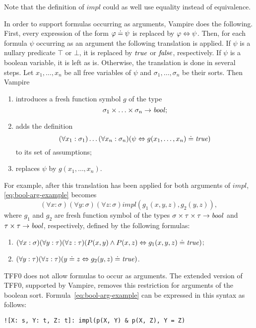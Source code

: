 Note that the definition of $\mathit{impl}$ could as well use equality instead of equivalence.

In order to support formulas occurring as arguments, Vampire does the following. First, every expression of the form $\varphi \doteq \psi$ is replaced by $\varphi \Leftrightarrow \psi$. Then, for each formula $\psi$ occurring as an argument the following translation is applied. If $\psi$ is a nullary predicate $\top$ or $\bot$, it is replaced by $\mathit{true}$ or $\mathit{false}$, respectively. If $\psi$ is a boolean variable, it is left as is. Otherwise, the translation is done in several steps. Let $x_1,\ldots,x_n$ be all free variables of $\psi$ and $\sigma_1,\ldots,\sigma_n$ be their sorts. Then Vampire
\begin{enumerate}
  \item introduces a fresh function symbol $g$ of the type $$\sigma_1 \times \ldots \times \sigma_n \to \mathit{bool};$$
  \item adds the definition $$(\forall x_1:\sigma_1)\ldots(\forall x_n:\sigma_n)(\psi \Leftrightarrow g(x_1,\ldots,x_n) \doteq \mathit{true})$$ to its set of assumptions;
  \item replaces $\psi$ by $g(x_1,\ldots,x_n)$.
\end{enumerate}

For example, after this translation has been applied for both arguments of $\mathit{impl}$, \eqref{eq:bool-arg-example} becomes $$(\forall x:\sigma)(\forall y:\sigma)(\forall z:\sigma)\mathit{impl}(g_1(x, y, z), g_2(y, z)),$$ where $g_1$ and $g_2$ are fresh function symbol of the types $\sigma \times \tau \times \tau \to \mathit{bool}$ and $\tau \times \tau \to \mathit{bool}$, respectively, defined by the following formulas:
\begin{enumerate}
  \item $(\forall x:\sigma)(\forall y:\tau)(\forall z:\tau)(P(x,y) \land P(x,z) \Leftrightarrow g_1(x,y,z) \doteq \mathit{true})$;
  \item $(\forall y:\tau)(\forall z:\tau)(y \doteq z \Leftrightarrow g_2(y,z) \doteq \mathit{true})$.
\end{enumerate}

TFF0 does not allow formulas to occur as arguments. The extended version of TFF0, supported by Vampire, removes this restriction for arguments of the boolean sort. Formula~\eqref{eq:bool-arg-example} can be expressed in this syntax as follows:
\begin{lstlisting}[language=tptp]
![X: s, Y: t, Z: t]: impl(p(X, Y) & p(X, Z), Y = Z)
\end{lstlisting}

